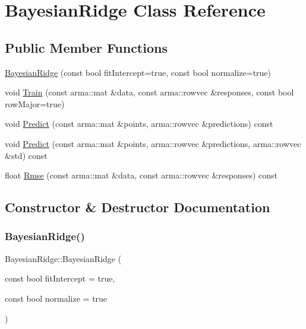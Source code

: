 \hypertarget{classBayesianRidge}{}\section{Bayesian\+Ridge Class Reference}
\label{classBayesianRidge}
\subsection*{Public Member Functions}
\begin{DoxyCompactItemize}
\item 
\hyperlink{classBayesianRidge_aa73ecf5a2214a1ed168cec483f793131}{Bayesian\+Ridge} (const bool fit\+Intercept=true, const bool normalize=true)
\item 
void \hyperlink{classBayesianRidge_a7399d731fd6555af2dfac15c2f4eee93}{Train} (const arma\+::mat \&data, const arma\+::rowvec \&responses, const bool row\+Major=true)
\item 
void \hyperlink{classBayesianRidge_a408394085602d5e3faa6d915efb4075b}{Predict} (const arma\+::mat \&points, arma\+::rowvec \&predictions) const
\item 
void \hyperlink{classBayesianRidge_a91a6932573bc4ccec97341e37b8c9cd3}{Predict} (const arma\+::mat \&points, arma\+::rowvec \&predictions, arma\+::rowvec \&std) const
\item 
float \hyperlink{classBayesianRidge_a9ff299095daee3a6c521a52435fb9ebd}{Rmse} (const arma\+::mat \&data, const arma\+::rowvec \&responses) const
\end{DoxyCompactItemize}


\subsection{Constructor \& Destructor Documentation}
\mbox{\label{classBayesianRidge_aa73ecf5a2214a1ed168cec483f793131}} 
\subsubsection{\texorpdfstring{Bayesian\+Ridge()}{BayesianRidge()}}
{\footnotesize\ttfamily Bayesian\+Ridge\+::\+Bayesian\+Ridge (\begin{DoxyParamCaption}\item[{const bool}]{fit\+Intercept = {\ttfamily true},  }\item[{const bool}]{normalize = {\ttfamily true} }\end{DoxyParamCaption})}

